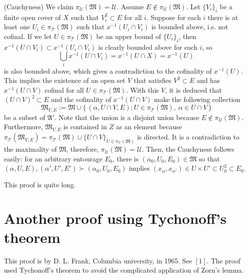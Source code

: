 \documentclass[11pt]{amsart}
\begin{document}
\begin{pf}
(Cauchyness)
We claim $\pi_\mathcal{U}(\mathfrak{M})=\mathcal{U}$.
Assume $E\notin\pi_\mathcal{U}(\mathfrak{M})$.
Let $\{V_i\}_i$ be a finite open cover of $X$ such that $V_i^2\subset E$ for all $i$.
Suppose for each $i$ there is at least one $U_i\in\pi_\mathcal{T}(\mathfrak{M})$ such that $x^{-1}(U_i\cap V_i)$ is bounded above, i.e. not cofinal.
If we let $U\in\pi_\mathcal{T}(\mathfrak{M})$ be an upper bound of $\{U_i\}_i$, then $x^{-1}(U\cap V_i)\subset x^{-1}(U_i\cap V_i)$ is clearly bounded above for each $i$, so
\[\bigcup_ix^{-1}(U\cap V_i)=x^{-1}(U\cap X)=x^{-1}(U)\]
is also bounded above, which gives a contradiction to the cofinality of $x^{-1}(U)$.
This implies the existence of an open set $V$ that satisfies $V^2\subset E$ and has $x^{-1}(U\cap V)$ cofinal for all $U\in\pi_\mathcal{T}(\mathfrak{M})$.
With this $V$, it is deduced that $(U\cap V)^2\subset E$ and the cofinality of $x^{-1}(U\cap V)$ make the following collection
\[\mathfrak{M}_{V,E}:=\mathfrak{M}\cup\{\,(\alpha,U\cap V,E):U\in\pi_\mathcal{T}(\mathfrak{M}),\ \alpha\in U\cap V\,\}\]
be a subset of $\mathfrak{A}'$.
Note that the union is a disjoint union because $E\notin\pi_\mathcal{U}(\mathfrak{M})$.
Furthermore, $\mathfrak{M}_{V,E}$ is contained in $Z$ as an element because $\pi_\mathcal{T}(\mathfrak{M}_{V,E})=\pi_\mathcal{T}(\mathfrak{M})\cup\{U\cap V\}_{U\in\pi_\mathcal{T}(\mathfrak{M})}$ is directed.
It is a contradiction to the maximality of $\mathfrak{M}$, therefore, $\pi_\mathcal{U}(\mathfrak{M})=\mathcal{U}$.
Then, the Cauchyness follows easily: for an arbitrary entourage $E_0$, there is $(\alpha_0,U_0,E_0)\in\mathfrak{M}$ so that $(\alpha,U,E),(\alpha',U',E')\succ(\alpha_0,U_0,E_0)$ implies $(x_\alpha,x_{\alpha'})\in U\times U'\subset U_0^2\subset E_0$.
\end{pf}

This proof is quite long.






\section{Another proof using Tychonoff's theorem}

This proof is by D. L. Frank, Columbia university, in 1965.
See $[1]$.
The proof used Tychonoff's theorem to avoid the complicated application of Zorn's lemma.
\end{document}
